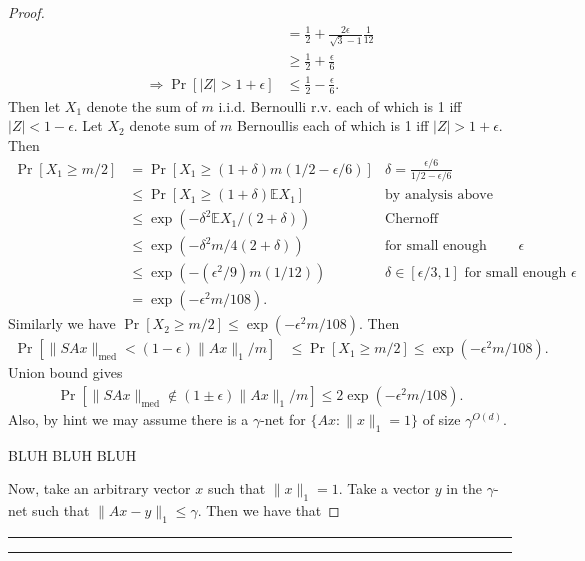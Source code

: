 \documentclass[11pt]{article}
\newcommand{\question}[1] {\vspace{.3in} \hrule\vspace{0.3em}
\noindent{\bf #1} \vspace{0.7em}
\hrule \vspace{.10in}}
\begin{document}
\begin{proof}
\begin{align*}
  &= \frac{1}{2} + \frac{2\epsilon}{\sqrt{3} - 1} \frac{1}{12}\\
  &\ge \frac{1}{2} + \frac{\epsilon}{6}\\
  \Rightarrow \Pr[|Z| > 1 + \epsilon] &\le \frac{1}{2} - \frac{\epsilon}{6}.
\end{align*}
Then let $X_1$ denote the sum of $m$ i.i.d. Bernoulli r.v. each of which is 1 iff $|Z| < 1 - \epsilon$. Let $X_2$ denote sum of $m$ Bernoullis each of which is 1 iff $|Z| > 1 + \epsilon$. Then
\begin{align*}
  \Pr[X_1 \ge m/2] &= \Pr[X_1 \ge (1 + \delta)m(1/2 - \epsilon/6)] &\delta = \frac{\epsilon/6}{1/2 - \epsilon/6}\\
  &\le \Pr[X_1 \ge (1 + \delta)\mathbb{E}X_1] &\text{by analysis above}\\
  &\le \exp\left(-\delta^2 \mathbb{E}X_1/ (2 + \delta)\right) &\text{Chernoff}\\
  &\le \exp\left(-\delta^2m/4(2 + \delta)\right) &\text{for small enough constant }\epsilon\\
  &\le \exp\left(-(\epsilon^2/9)m(1/12)\right) &\delta \in [\epsilon/3, 1] \text{ for small enough }\epsilon\\
  &= \exp(-\epsilon^2m/108).
\end{align*}
Similarly we have $\Pr[X_2 \ge m/2] \le \exp(-\epsilon^2m/108)$. Then
\begin{align*}
  \Pr[\|SAx\|_{\text{med}} < (1 - \epsilon)\|Ax\|_1/m] &\le \Pr[X_1 \ge m/2] \le \exp(-\epsilon^2 m / 108).
\end{align*}
Union bound gives
\begin{align*}
  \Pr[\|SAx\|_{\text{med}} \notin (1 \pm \epsilon) \|Ax\|_1/m] \le 2\exp(- \epsilon^2 m /108).
\end{align*}
Also, by hint we may assume there is a $\gamma$-net for $\{Ax : \|x\|_1 = 1\}$ of size $\gamma^{O(d)}$.

BLUH BLUH BLUH 

Now, take an arbitrary vector $x$ such that $\|x\|_1 = 1$. Take a vector $y$ in the $\gamma$-net such that $\|Ax - y\|_1 \le \gamma$. Then we have that 

\end{proof}

\newpage
\question{Task 2}
\end{document}
